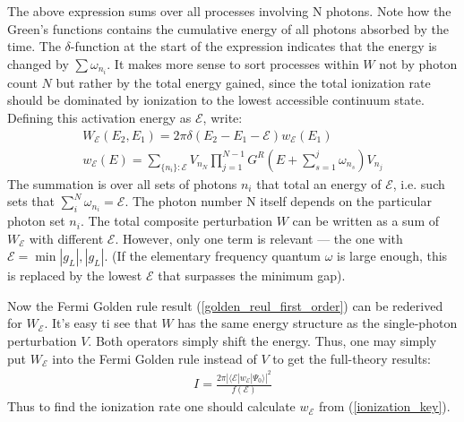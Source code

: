 The above expression sums over all processes involving N photons. Note how the Green's functions contains the cumulative energy of all photons absorbed by the time. The $ \delta $-function at the start of the expression indicates that the energy is changed by $ \sum\omega_{n_{i}} $. It makes more sense to sort processes within $ W $ not by photon count $ N $ but rather by the total energy gained, since the total ionization rate should be dominated by ionization to the lowest accessible continuum state. Defining this activation energy as $ \mathcal{E} $, write:
\begin{gather}
W_{\mathcal{E}}(E_{2},E_{1})=2\pi\delta(E_{2}-E_{1}-\mathcal{E})w_{\mathcal{E}}(E_{1})\\
\label{ionization_key}
w_{\mathcal{E}}(E)=\sum_{\{n_{i}\}:\mathcal{E}}V_{n_{N}}\prod_{j=1}^{N-1}G^{R}\left(E+\sum_{s=1}^{j}\omega_{n_{s}}\right)V_{n_{j}}
\end{gather}
The summation is over all sets of photons $ {n_{i}} $ that total an energy of $ \mathcal{E} $, i.e. such sets that $ \sum_{i}^{N}\omega_{n_{i}}=\mathcal{E} $. The photon number N itself depends on the particular photon set $ n_{i} $. The total composite perturbation $ W $ can be written as a sum of $ W_{\mathcal{E}} $ with different $ \mathcal{E} $. However, only one term is relevant --- the one with $ \mathcal{E}=\min{|g_{L}|,|g_{L}| }$. (If the elementary frequency quantum $ \omega $ is large enough, this is replaced by the lowest $ \mathcal{E} $ that surpasses the minimum gap). 

Now  the Fermi Golden rule result (\ref{golden_reul_first_order}) can be rederived 	for $ W_{\mathcal{E}} $. It's easy ti see that $ W $ has the same energy structure as the single-photon perturbation $ V $. Both operators simply shift the energy. Thus, one may simply put $ W_{\mathcal{E}} $ into the Fermi Golden rule instead of $ V $ to get the full-theory results:
\begin{gather}
	I=\frac{2\pi|\langle\mathcal{E}|w_{\mathcal{E}}|\Psi_{0}\rangle|^{2}}{f(\mathcal{E})}
\end{gather}
Thus to find the ionization rate one should calculate $ w_{\mathcal{E}} $ from (\ref{ionization_key}).